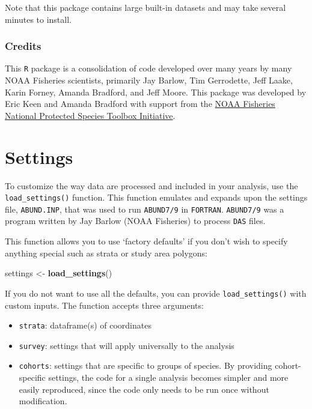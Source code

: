 \documentclass[
]{book}
\newenvironment{Shaded}{\begin{snugshade}}{\end{snugshade}}
\newcommand{\FunctionTok}[1]{\textcolor[rgb]{0.13,0.29,0.53}{\textbf{#1}}}
\newcommand{\NormalTok}[1]{#1}
\newcommand{\OtherTok}[1]{\textcolor[rgb]{0.56,0.35,0.01}{#1}}
\begin{document}
Note that this package contains large built-in datasets and may take several minutes to install.

\hypertarget{credits}{%
\subsection*{Credits}\label{credits}}

This \texttt{R} package is a consolidation of code developed over many years by many NOAA Fisheries scientists, primarily Jay Barlow, Tim Gerrodette, Jeff Laake, Karin Forney, Amanda Bradford, and Jeff Moore. This package was developed by Eric Keen and Amanda Bradford with support from the \href{https://www.fisheries.noaa.gov/national/population-assessments/national-protected-species-toolbox-initiative}{NOAA Fisheries National Protected Species Toolbox Initiative}.

\hypertarget{settings}{%
\chapter{Settings}\label{settings}}

To customize the way data are processed and included in your analysis, use the \texttt{load\_settings()} function. This function emulates and expands upon the settings file, \texttt{ABUND.INP}, that was used to run \texttt{ABUND7/9} in \texttt{FORTRAN}. \texttt{ABUND7/9} was a program written by Jay Barlow (NOAA Fisheries) to process \texttt{DAS} files.

This function allows you to use `factory defaults' if you don't wish to specify anything special such as strata or study area polygons:

\begin{Shaded}
\begin{Highlighting}[]
\NormalTok{settings }\OtherTok{\textless{}{-}} \FunctionTok{load\_settings}\NormalTok{()}
\end{Highlighting}
\end{Shaded}

If you do not want to use all the defaults, you can provide \texttt{load\_settings()} with custom inputs. The function accepts three arguments:

\begin{itemize}
\item
  \texttt{strata}: dataframe(s) of coordinates
\item
  \texttt{survey}: settings that will apply universally to the analysis
\item
  \texttt{cohorts}: settings that are specific to groups of species. By providing cohort-specific settings, the code for a single analysis becomes simpler and more easily reproduced, since the code only needs to be run once without modification.
\end{itemize}
\end{document}
